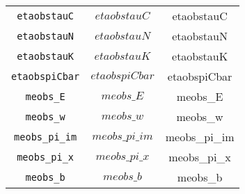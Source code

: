 \begin{center}
\begin{longtable}{ccc}
\texttt{etaobstauC} & $etaobstauC$ & etaobstauC\\
\texttt{etaobstauN} & $etaobstauN$ & etaobstauN\\
\texttt{etaobstauK} & $etaobstauK$ & etaobstauK\\
\texttt{etaobspiCbar} & $etaobspiCbar$ & etaobspiCbar\\
\texttt{meobs\_E} & $meobs\_E$ & meobs\_E\\
\texttt{meobs\_w} & $meobs\_w$ & meobs\_w\\
\texttt{meobs\_pi\_im} & $meobs\_pi\_im$ & meobs\_pi\_im\\
\texttt{meobs\_pi\_x} & $meobs\_pi\_x$ & meobs\_pi\_x\\
\texttt{meobs\_b} & $meobs\_b$ & meobs\_b\\
\hline%
\end{longtable}
\end{center}
